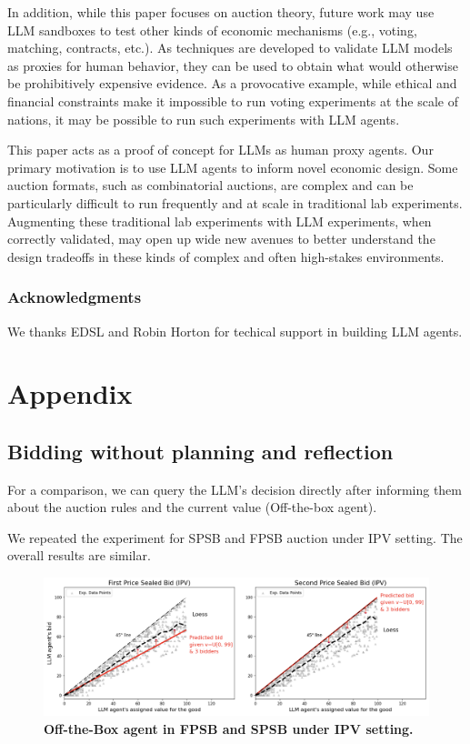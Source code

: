 \documentclass{article} %
\begin{document}
In addition, while this paper focuses on auction theory, future work may use LLM sandboxes to test other  kinds of
economic mechanisms (e.g., voting, matching, contracts, etc.). 
As techniques are developed to validate LLM models as proxies for human behavior, they can be used to obtain what would otherwise be prohibitively expensive evidence. 
As a provocative example, while ethical and financial constraints make it impossible to run voting experiments at the scale of nations, it may be possible to run such experiments with LLM agents. 

This paper acts as a proof of concept for LLMs as human proxy agents. 
Our primary motivation is to  use LLM agents to inform novel
economic design. 
Some auction formats, such as combinatorial auctions, are complex and can be  particularly difficult to run frequently and at scale in traditional lab experiments. 
Augmenting these traditional lab experiments with LLM experiments, when correctly validated, may open up wide new avenues 
to better understand the design tradeoffs in these kinds of complex and often high-stakes environments.


\subsubsection*{Acknowledgments}
We thanks EDSL and Robin Horton for techical support in building LLM agents.





\appendix
\section{Appendix}

\subsection{Bidding without planning and reflection}

For a comparison, we can query the LLM's decision directly after informing them about the auction rules and the current value (Off-the-box agent). 

We repeated the experiment for SPSB and FPSB auction under IPV setting. 
The overall results are similar.

\begin{figure}[h]
    \centering \includegraphics[width=\linewidth]{Figs/FPSB_off-box.png}
    \caption{\textbf{ Off-the-Box agent in FPSB and SPSB under IPV setting.} }
    \label{fig:fpsb}

\end{figure}
\end{document}
